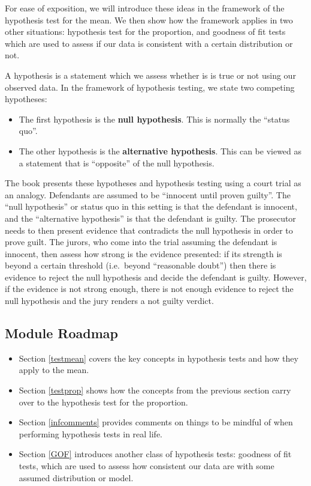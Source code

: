 \documentclass[
]{book}
\providecommand{\tightlist}{%
  \setlength{\itemsep}{0pt}\setlength{\parskip}{0pt}}
\begin{document}
For ease of exposition, we will introduce these ideas in the framework of the hypothesis test for the mean. We then show how the framework applies in two other situations: hypothesis test for the proportion, and goodness of fit tests which are used to assess if our data is consistent with a certain distribution or not.

A hypothesis is a statement which we assess whether is is true or not using our observed data. In the framework of hypothesis testing, we state two competing hypotheses:

\begin{itemize}
\item
  The first hypothesis is the \textbf{null hypothesis}. This is normally the ``status quo''.
\item
  The other hypothesis is the \textbf{alternative hypothesis}. This can be viewed as a statement that is ``opposite'' of the null hypothesis.
\end{itemize}

The book presents these hypotheses and hypothesis testing using a court trial as an analogy. Defendants are assumed to be ``innocent until proven guilty''. The ``null hypothesis'' or status quo in this setting is that the defendant is innocent, and the ``alternative hypothesis'' is that the defendant is guilty. The prosecutor needs to then present evidence that contradicts the null hypothesis in order to prove guilt. The jurors, who come into the trial assuming the defendant is innocent, then assess how strong is the evidence presented: if its strength is beyond a certain threshold (i.e.~beyond ``reasonable doubt'') then there is evidence to reject the null hypothesis and decide the defendant is guilty. However, if the evidence is not strong enough, there is not enough evidence to reject the null hypothesis and the jury renders a not guilty verdict.

\hypertarget{module-roadmap-7}{%
\subsection{Module Roadmap}\label{module-roadmap-7}}

\begin{itemize}
\tightlist
\item
  Section \ref{testmean} covers the key concepts in hypothesis tests and how they apply to the mean.
\item
  Section \ref{testprop} shows how the concepts from the previous section carry over to the hypothesis test for the proportion.
\item
  Section \ref{infcomments} provides comments on things to be mindful of when performing hypothesis tests in real life.
\item
  Section \ref{GOF} introduces another class of hypothesis tests: goodness of fit tests, which are used to assess how consistent our data are with some assumed distribution or model.
\end{itemize}
\end{document}
